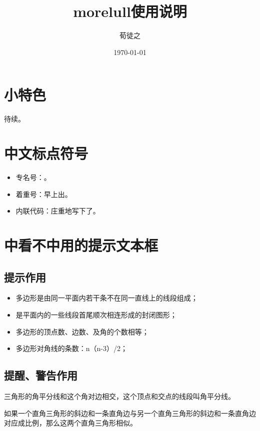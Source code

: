 \documentclass{morelull}
\title{morelull使用说明}
\author{荀徒之}
\date{\today}
\begin{document}
\maketitle
\tableofcontents

\section{小特色}
待续。

\section{中文标点符号}

\begin{itemize}
\item{专名号：。}
\item{着重号：早上出。}
\item{内联代码：庄重地写下了。}
\end{itemize}

\section{中看不中用的提示文本框}

\subsection{提示作用}
\begin{提示}
    \begin{itemize}
    \item{多边形是由同一平面内若干条不在同一直线上的线段组成；}
    \item{是平面内的一些线段首尾顺次相连形成的封闭图形；}
    \item{多边形的顶点数、边数、及角的个数相等；}
    \item{多边形对角线的条数：n（n-3）/2；}
    \end{itemize}
\end{提示}

\subsection{提醒、警告作用}
\begin{提醒}
    三角形的角平分线和这个角对边相交，这个顶点和交点的线段叫角平分线。

    如果一个直角三角形的斜边和一条直角边与另一个直角三角形的斜边和一条直角边对应成比例，那么这两个直角三角形相似。
\end{提醒}
\end{document}
